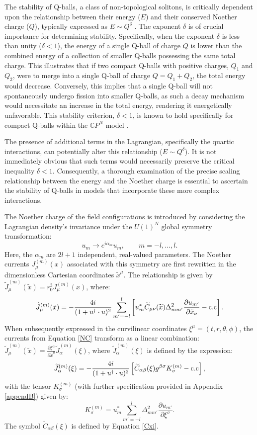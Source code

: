 \documentclass[aps,prd,superscriptaddress,notitlepage,11pt,final,longbibliography,nofootinbib]{revtex4-1}
\newcommand{\be}{\begin{equation}}
\newcommand{\ee}{\end{equation}}
\numberwithin{equation}{section}
\begin{document}
The stability of Q-balls, a class of non-topological solitons, is critically dependent upon the relationship between their energy ($E$) and their conserved Noether charge ($Q$), typically expressed as $E \sim Q^{\delta}$ \cite{Arodz:2008nm}. The exponent $\delta$ is of crucial importance for determining stability. Specifically, when the exponent $\delta$ is less than unity ($\delta < 1$), the energy of a single Q-ball of charge $Q$ is lower than the combined energy of a collection of smaller Q-balls possessing the same total charge. This illustrates that if two compact Q-balls with positive charges, $Q_1$ and $Q_2$, were to merge into a single Q-ball of charge $Q=Q_1+Q_2$, the total energy would decrease. Conversely, this implies that a single Q-ball will not spontaneously undergo fission into smaller Q-balls, as such a decay mechanism would necessitate an increase in the total energy, rendering it energetically unfavorable. This stability criterion, $\delta < 1$, is known to hold specifically for compact Q-balls within the $\mathbb{C}P^N$ model \cite{Klimas:2017eft}.

The presence of additional terms in the Lagrangian, specifically the quartic interactions, can potentially alter this relationship ($E \sim Q^{\delta}$). It is not immediately obvious that such terms would necessarily preserve the critical inequality $\delta < 1$. Consequently, a thorough examination of the precise scaling relationship between the energy and the Noether charge is essential to ascertain the stability of Q-balls in models that incorporate these more complex interactions.

The Noether charge of the field configurations is introduced by considering the Lagrangian density's invariance under the $U(1)^{N}$ global symmetry transformation:
\[
u_m\rightarrow e^{i\alpha_m}u_m,\qquad m=-l,\ldots,l.
\]
Here, the $\alpha_m$ are $2l+1$ independent, real-valued parameters. The Noether currents $J_{\mu}^{(m)}(x)$ associated with this symmetry are first rewritten in the dimensionless Cartesian coordinates $\tilde{x}^{\mu}$. The relationship is given by $\widetilde{J}_{\mu}^{(m)}(\tilde{x})=r_0^3J_{\mu}^{(m)}(x)$, where:
\be
\widetilde J_{\mu}^{(m)}(\tilde x)=-\frac{4i}{(1+u^{\dagger}\cdot u)^2}\sum_{m'=-l}^l \left[u^*_m \widetilde C_{\mu\nu}(\widetilde x)\Delta^2_{mm'}\frac{\partial u_{m'}}{\partial \tilde x_{\nu}}-{\rm c.c}\right].\label{NC}
\ee
When subsequently expressed in the curvilinear coordinates $\xi^{\mu}=(t,r,\theta,\phi)$, the currents from Equation \eqref{NC} transform as a linear combination: $\widetilde{J}_{\mu}^{(m)}(\tilde{x})=\frac{\partial\xi^{\alpha}}{\partial \tilde{x}^{\mu}}\widetilde{J}_{\alpha}^{(m)}(\xi)$, where $\widetilde{J}_{\alpha}^{(m)}(\xi)$ is defined by the expression:
\be
\widetilde J_{\alpha}^{(m)}(\xi)=-\frac{4i}{(1+u^{\dagger}\cdot u)^2}\left[ \widetilde C_{\alpha\beta}(\xi)g^{\beta\sigma}K^{(m)}_{\sigma}-{\rm c.c}\right],\label{NC1}
\ee
with the tensor $K^{(m)}_{\sigma}$ (with further specification provided in  Appendix \eqref{appendB}) given by:
\be
K^{(m)}_{\sigma}=u^*_m\sum_{m'=-l}^l \Delta^2_{mm'}\frac{\partial u_{m'}}{\partial\xi^{\sigma}}.\nonumber
\ee
The symbol $\widetilde{C}_{\alpha\beta}(\xi)$ is defined by Equation \eqref{Cxi}.
\end{document}
